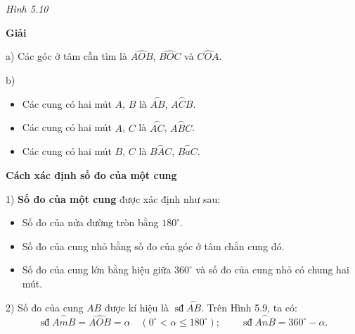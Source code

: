 \begin{lesson}
    \begin{center}

        \textit{Hình 5.10}
    \end{center}

    \textbf{Giải}

    a) Các góc ở tâm cần tìm là $\widehat{AOB}$, $\widehat{BOC}$ và $\widehat{COA}$.

    b)
    \begin{itemize}
        \item Các cung có hai mút $A$, $B$ là $\overset{\frown}{AB}$, $\overset{\frown}{ACB}$.
        \item Các cung có hai mút $A$, $C$ là $\overset{\frown}{AC}$, $\overset{\frown}{ABC}$.
        \item Các cung có hai mút $B$, $C$ là $\overset{\frown}{BAC}$, $\overset{\frown}{BaC}$.
    \end{itemize}

    \textbf{Cách xác định số đo của một cung}

    1) \textbf{Số đo của một cung} được xác định như sau:
    \begin{itemize}
        \item Số đo của nửa đường tròn bằng $180^\circ$.
        \item Số đo của cung nhỏ bằng số đo của góc ở tâm chắn cung đó.
        \item Số đo của cung lớn bằng hiệu giữa $360^\circ$ và số đo của cung nhỏ có chung hai mút.
    \end{itemize}

    2) Số đo của cung $AB$ được kí hiệu là $\operatorname{sđ}\overset{\frown}{AB}$. Trên Hình 5.9, ta có:
    \[
        \operatorname{sđ}\overset{\frown}{AmB}=\widehat{AOB}=\alpha\quad(0^\circ<\alpha\le180^\circ);
        \qquad
        \operatorname{sđ}\overset{\frown}{AnB}=360^\circ-\alpha.
    \]


\end{lesson}
